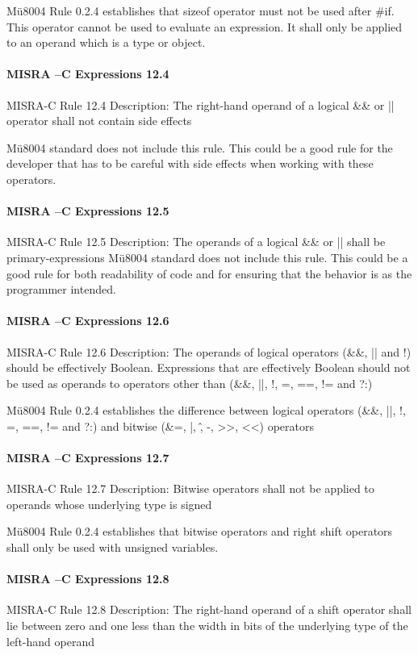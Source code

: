 Mü8004 Rule 0.2.4 establishes that sizeof operator must not be used after \#if. This operator cannot be used to evaluate an expression. It shall only be applied to an operand which is a type or object.

\paragraph{MISRA –C Expressions 12.4}
MISRA-C Rule 12.4 Description: The right-hand operand of a logical \&\& or || operator shall not contain side effects

Mü8004 standard does not include this rule. This could be a good rule for the developer that has to be careful with side effects when working with these operators.

\paragraph{MISRA –C Expressions 12.5}
MISRA-C Rule 12.5 Description: The operands of a logical \&\& or || shall be primary-expressions
Mü8004 standard does not include this rule. This could be a good rule for both readability of code and for ensuring that the behavior is as the programmer intended.

\paragraph{MISRA –C Expressions 12.6}
MISRA-C Rule 12.6 Description: The operands of logical operators (\&\&, || and !) should be effectively Boolean. Expressions that are effectively Boolean should not be used as operands to operators other than (\&\&, ||, !, =, ==, != and ?:)

Mü8004 Rule 0.2.4 establishes the difference between logical operators (\&\&, ||, !, =, ==, != and ?:) and bitwise (\&=, |, \^, -, >>, <<) operators

\paragraph{MISRA –C Expressions 12.7}
MISRA-C Rule 12.7 Description: Bitwise operators shall not be applied to operands whose underlying type is signed

Mü8004 Rule 0.2.4 establishes that bitwise operators and right shift operators shall only be used with unsigned variables.

\paragraph{MISRA –C Expressions 12.8}
MISRA-C Rule 12.8 Description: The right-hand operand of a shift operator shall lie between zero and one less than the width in bits of the underlying type of the left-hand operand


